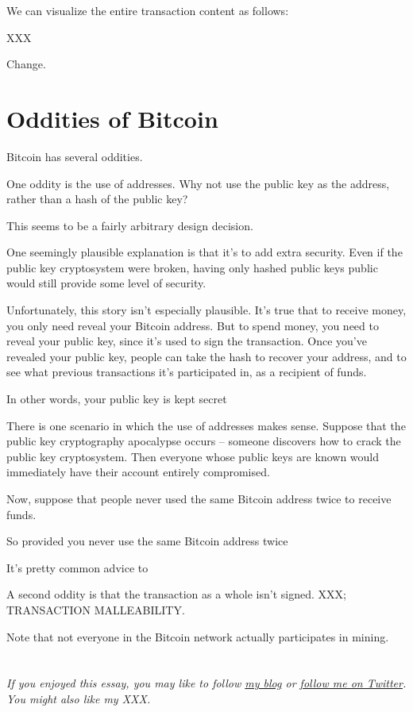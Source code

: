 \documentclass[12pt]{book}
\newcommand{\link}[2]{\href{#1}{#2}}
\begin{document}
We can visualize the entire transaction content as follows:

XXX



Change.

\section{Oddities of Bitcoin}

Bitcoin has several oddities.

One oddity is the use of addresses.  Why not use the public key as the
address, rather than a hash of the public key?

This seems to be a fairly arbitrary design decision.  

One seemingly plausible explanation is that it's to add extra
security.  Even if the public key cryptosystem were broken, having
only hashed public keys public would still provide some level of
security.

Unfortunately, this story isn't especially plausible.  It's true that
to receive money, you only need reveal your Bitcoin address.  But to
spend money, you need to reveal your public key, since it's used to
sign the transaction.  Once you've revealed your public key, people
can take the hash to recover your address, and to see what previous
transactions it's participated in, as a recipient of funds.

In other words, your public key is kept secret


There is one scenario in which the use of addresses makes sense.
Suppose that the public key cryptography apocalypse occurs -- someone
discovers how to crack the public key cryptosystem.  Then everyone
whose public keys are known would immediately have their account
entirely compromised.  

Now, suppose that people never used the same Bitcoin address twice to
receive funds.

So provided you never use the same Bitcoin address twice

It's pretty common advice to  

A second oddity is that the transaction as a whole isn't signed.  XXX; TRANSACTION MALLEABILITY.


Note that not everyone in the Bitcoin network actually participates in
mining.



\section{}


\emph{If you enjoyed this essay, you may like to follow \link{XXX}{my
    blog} or \link{XXX}{follow me on Twitter}.  You might also like my
  XXX.}
\end{document}
